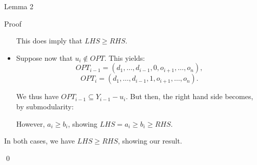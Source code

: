 \documentclass[a4paper]{article}
\begin{document}
\begin{parag}{Lemma 2}
\begin{subparag}{Proof}
\begin{itemize}[left=0pt]
            This does imply that $LHS \geq RHS$.

            \item Suppose now that $u_i \not\in OPT$. This yields:
            \[OPT_{i-1} = \left(d_1, \ldots, d_{i-1}, 0, o_{i+1}, \ldots, o_n\right),\] 
            \[OPT_{i} = \left(d_1, \ldots, d_{i-1}, 1, o_{i+1}, \ldots, o_n\right).\]
            
            We thus have $OPT_{i-1} \subseteq Y_{i-1} - u_i$. But then, the right hand side becomes, by submodularity: 
            
            However, $a_i \geq b_i$, showing $LHS = a_i \geq b_i \geq RHS$.
        \end{itemize}

        In both cases, we have $LHS \geq RHS$, showing our result.
        
        \qed
    \end{subparag}
\end{parag}
\end{document}
